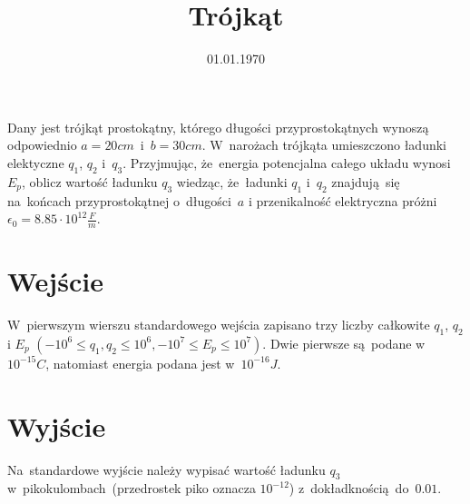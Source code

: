 \documentclass[zad]{soigstyl}
\date{01.01.1970}
\title{\mbox{Trójkąt}}
\begin{document}
\begin{tasktext}%
    \noindent
    Dany jest trójkąt prostokątny, którego długości przyprostokątnych wynoszą odpowiednio $a=20 cm$~i~$b=30 cm$. W~narożach trójkąta umieszczono ładunki elektyczne $q_1$, $q_2$ i~$q_3$. Przyjmując, że~energia potencjalna całego układu wynosi $E_p$, oblicz wartość ładunku $q_3$ wiedząc, że~ładunki $q_1$ i~$q_2$ znajdują~się na~końcach przyprostokątnej o~długości~$a$ i przenikalność elektryczna próżni $\epsilon_0=8.85\cdot10^{12} \frac{F}{m}$.
	
    	\section{Wejście}
	W~pierwszym wierszu standardowego wejścia zapisano trzy liczby całkowite $q_1$, $q_2$ i $E_p$ $(-10^6 \leqslant q_1, q_2 \leqslant 10^6, -10^7 \leqslant E_p \leqslant 10^7)$. Dwie pierwsze są~podane w~$10^{-15} C$, natomiast energia podana jest w~$10^{-16} J$. 

	\section{Wyjście}
	Na~standardowe wyjście należy wypisać wartość ładunku $q_3$ w~pikokulombach~(przedrostek piko oznacza $10^{-12}$) z~dokładknością~do~$0.01$.
	\oigprzyklady
\end{tasktext}
\end{document}
